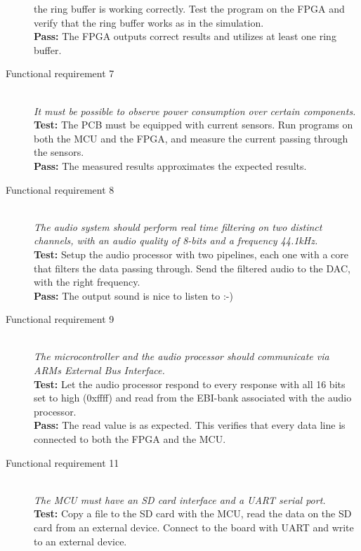 \begin{description}
        the ring buffer is working correctly.
        Test the program on the FPGA and verify that the ring buffer
        works as in the simulation. \\
        \textbf{Pass:} The FPGA outputs correct results and utilizes at least one ring buffer.
    \item[Functional requirement 7] \hfill \\
        \textit{It must be possible to observe power consumption over certain components.} \\
        \textbf{Test:} The PCB must be equipped with current sensors. Run programs
        on both the MCU and the FPGA, and measure the current passing through the sensors. \\
        \textbf{Pass:} The measured results approximates the expected results.
    \item[Functional requirement 8] \hfill \\
        \textit{The audio system should perform real time filtering on
        two distinct channels, with an audio quality of 8-bits and a frequency 44.1kHz.} \\
        \textbf{Test:} Setup the audio processor with two pipelines, each one with a core
        that filters the data passing through. Send the filtered audio to the DAC, with the
        right frequency. \\
        \textbf{Pass:} The output sound is nice to listen to :-)
    \item[Functional requirement 9] \hfill \\
        \textit{The microcontroller and the audio processor should communicate via ARMs
        External Bus Interface.} \\
        \textbf{Test:} Let the audio processor respond to every response with all 16 bits set
        to high (0xffff) and read from the EBI-bank associated with the audio processor. \\
        \textbf{Pass:} The read value is as expected. This verifies that every data line
        is connected to both the FPGA and the MCU.
    \item[Functional requirement 11] \hfill \\
        \textit{The MCU must have an SD card interface and a UART serial port.} \\
        \textbf{Test:} Copy a file to the SD card with the MCU, read the data on the SD card
        from an external device. Connect to the board with UART and write to an external device.\\

\end{description}
